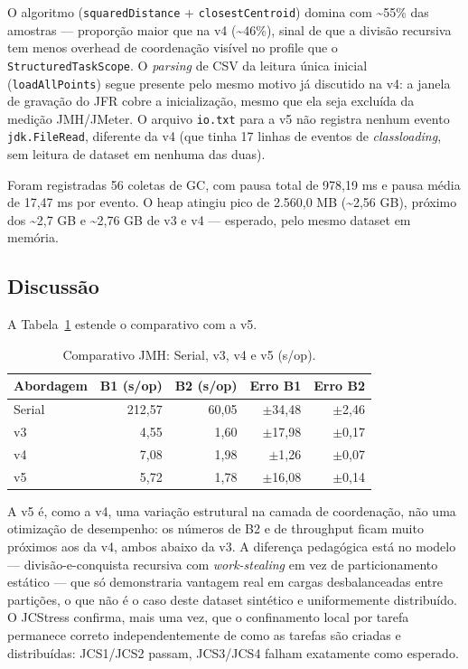 O algoritmo (\texttt{squaredDistance} + \texttt{closestCentroid}) domina
com \textasciitilde55\% das amostras --- proporção maior que na v4
(\textasciitilde46\%), sinal de que a divisão recursiva tem menos
overhead de coordenação visível no profile que o
\texttt{StructuredTaskScope}. O \textit{parsing} de CSV da leitura única
inicial (\texttt{loadAllPoints}) segue presente pelo mesmo motivo já
discutido na v4: a janela de gravação do JFR cobre a inicialização,
mesmo que ela seja excluída da medição JMH/JMeter. O arquivo
\texttt{io.txt} para a v5 não registra nenhum evento
\texttt{jdk.FileRead}, diferente da v4 (que tinha 17 linhas de eventos
de \textit{classloading}, sem leitura de dataset em nenhuma das duas).

Foram registradas 56 coletas de GC, com pausa total de 978,19 ms e
pausa média de 17,47 ms por evento. O heap atingiu pico de 2.560,0 MB
(\textasciitilde2,56 GB), próximo dos \textasciitilde2,7 GB e
\textasciitilde2,76 GB de v3 e v4 --- esperado, pelo mesmo dataset em
memória.

\subsection{Discussão}

A Tabela~\ref{tab:jmh-comparativo-v5} estende o comparativo com a v5.

\begin{table}[H]
\centering
\begin{tabular}{lrrrr}
\hline
\textbf{Abordagem} & \textbf{B1 (s/op)} & \textbf{B2 (s/op)} & \textbf{Erro B1} & \textbf{Erro B2} \\
\hline
Serial & 212{,}57 & 60{,}05 & $\pm$34{,}48 & $\pm$2{,}46 \\
v3     &   4{,}55 &  1{,}60 & $\pm$17{,}98 & $\pm$0{,}17 \\
v4     &   7{,}08 &  1{,}98 &  $\pm$1{,}26 & $\pm$0{,}07 \\
v5     &   5{,}72 &  1{,}78 & $\pm$16{,}08 & $\pm$0{,}14 \\
\hline
\end{tabular}
\caption{Comparativo JMH: Serial, v3, v4 e v5 (s/op).}
\label{tab:jmh-comparativo-v5}
\end{table}

A v5 é, como a v4, uma variação estrutural na camada de coordenação, não
uma otimização de desempenho: os números de B2 e de throughput ficam
muito próximos aos da v4, ambos abaixo da v3. A diferença pedagógica
está no modelo --- divisão-e-conquista recursiva com \textit{work-stealing}
em vez de particionamento estático --- que só demonstraria vantagem real
em cargas desbalanceadas entre partições, o que não é o caso deste
dataset sintético e uniformemente distribuído. O JCStress confirma, mais
uma vez, que o confinamento local por tarefa permanece correto
independentemente de como as tarefas são criadas e distribuídas: JCS1/JCS2
passam, JCS3/JCS4 falham exatamente como esperado.

